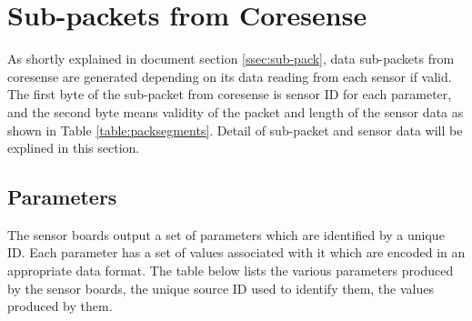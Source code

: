 \newpage
\section{Sub-packets from Coresense}

As shortly explained in document section \ref{ssec:sub-pack}, data sub-packets from coresense are generated depending on its data reading from each sensor if valid. The first byte of the sub-packet from coresense is sensor ID for each parameter, and the second byte means validity of the packet and length of the sensor data as shown in Table \ref{table:packsegments}. Detail of sub-packet and sensor data will be explined in this section.


\subsection{Parameters}

The sensor boards output a set of parameters which are identified by a unique ID. Each parameter
has a set of values associated with it which are encoded in an appropriate data format. The table
below lists the various parameters produced by the sensor boards, the unique source ID used to identify them, the values produced by them.


